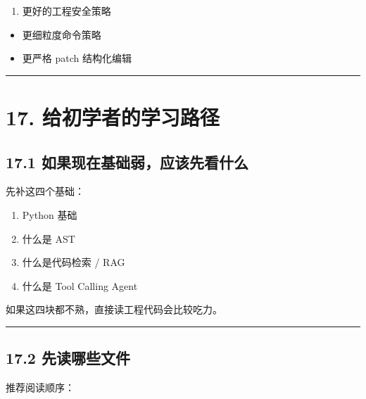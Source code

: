 \documentclass[UTF8,12pt,openany]{ctexbook}
\begin{document}
\begin{enumerate}
\item 更好的工程安全策略
\end{enumerate}
\begin{itemize}
\item 更细粒度命令策略
\item 更严格 patch 结构化编辑
\end{itemize}

\hrule

\section{17. 给初学者的学习路径}

\subsection{17.1 如果现在基础弱，应该先看什么}

先补这四个基础：\par

\begin{enumerate}
\item Python 基础
\item 什么是 AST
\item 什么是代码检索 / RAG
\item 什么是 Tool Calling Agent
\end{enumerate}

如果这四块都不熟，直接读工程代码会比较吃力。\par

\hrule

\subsection{17.2 先读哪些文件}

推荐阅读顺序：\par
\end{document}
